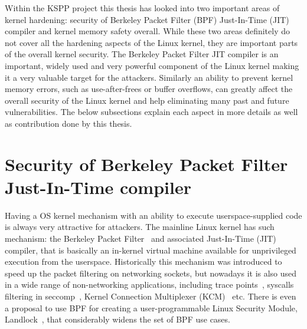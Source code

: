 
Within the KSPP project this thesis has looked into two important areas of kernel hardening: security of Berkeley Packet Filter (BPF) Just-In-Time (JIT) compiler and kernel memory safety overall. While these two areas definitely do not cover all the hardening aspects of the Linux kernel, they are important parts of the overall kernel security. The Berkeley Packet Filter JIT compiler is an important, widely used and very powerful component of the Linux kernel making it a very valuable target for the attackers. Similarly an ability to prevent kernel memory errors, such as use-after-frees or buffer overflows, can greatly affect the overall security of the Linux kernel and help eliminating many past and future vulnerabilities. The below subsections explain each aspect in more details as well as contribution done by this thesis.  

\section{Security of Berkeley Packet Filter Just-In-Time compiler}
\label{sec:bpf-jit-attack}

Having a OS kernel mechanism with an ability to execute userspace-supplied code is always very attractive for attackers. 
The mainline Linux kernel has such mechanism: the Berkeley Packet Filter~\cite{kernelfilter2016} and associated Just-In-Time (JIT) compiler, that is basically an in-kernel virtual machine available for unprivileged execution from the userspace. Historically this mechanism was introduced to speed up the packet filtering on networking sockets, but nowadays it is also used in a wide range of non-networking applications, including trace points~\cite{starovoitov2015}, syscalls filtering in seccomp~\cite{seccomp2016}, Kernel Connection Multiplexer (KCM)~\cite{corbet2015} etc. There is even a proposal to use BPF for creating a user-programmable Linux Security Module, Landlock~\cite{landlock2016}, that considerably widens the set of BPF use cases.

